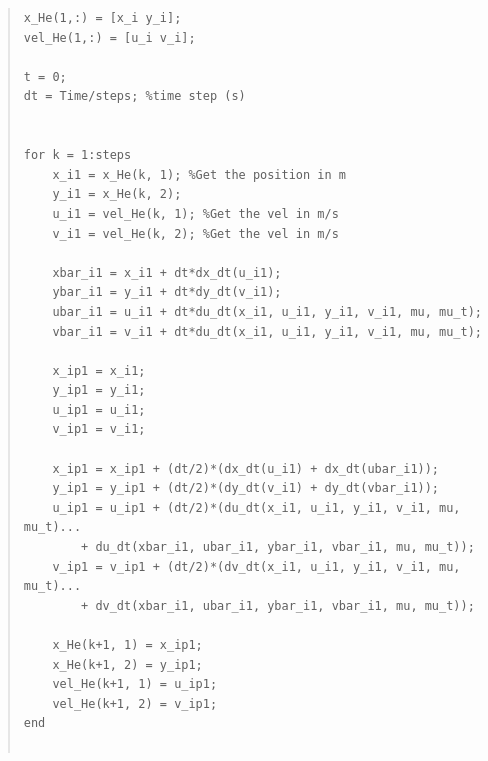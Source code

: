 \documentclass[conf]{new-aiaa}
\begin{document}
\begin{quote}
\begin{lstlisting}
x_He(1,:) = [x_i y_i];
vel_He(1,:) = [u_i v_i];

t = 0;
dt = Time/steps; %time step (s)


for k = 1:steps
    x_i1 = x_He(k, 1); %Get the position in m
    y_i1 = x_He(k, 2);
    u_i1 = vel_He(k, 1); %Get the vel in m/s
    v_i1 = vel_He(k, 2); %Get the vel in m/s

    xbar_i1 = x_i1 + dt*dx_dt(u_i1);
    ybar_i1 = y_i1 + dt*dy_dt(v_i1);
    ubar_i1 = u_i1 + dt*du_dt(x_i1, u_i1, y_i1, v_i1, mu, mu_t);
    vbar_i1 = v_i1 + dt*du_dt(x_i1, u_i1, y_i1, v_i1, mu, mu_t);
    
    x_ip1 = x_i1;
    y_ip1 = y_i1;
    u_ip1 = u_i1;
    v_ip1 = v_i1;

    x_ip1 = x_ip1 + (dt/2)*(dx_dt(u_i1) + dx_dt(ubar_i1));
    y_ip1 = y_ip1 + (dt/2)*(dy_dt(v_i1) + dy_dt(vbar_i1));
    u_ip1 = u_ip1 + (dt/2)*(du_dt(x_i1, u_i1, y_i1, v_i1, mu, mu_t)...
        + du_dt(xbar_i1, ubar_i1, ybar_i1, vbar_i1, mu, mu_t));
    v_ip1 = v_ip1 + (dt/2)*(dv_dt(x_i1, u_i1, y_i1, v_i1, mu, mu_t)...
        + dv_dt(xbar_i1, ubar_i1, ybar_i1, vbar_i1, mu, mu_t));

    x_He(k+1, 1) = x_ip1;
    x_He(k+1, 2) = y_ip1;
    vel_He(k+1, 1) = u_ip1;
    vel_He(k+1, 2) = v_ip1;
end


\end{lstlisting}
\end{quote}
\end{document}
